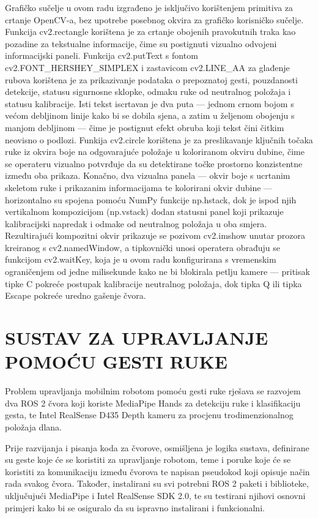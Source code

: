 \documentclass[12pt,a4paper,oneside]{report}
\begin{document}
Grafičko sučelje u ovom radu izgrađeno je isključivo korištenjem primitiva za crtanje OpenCV-a, bez 
upotrebe posebnog okvira za grafičko korisničko sučelje. Funkcija cv2.rectangle korištena je za crtanje 
obojenih pravokutnih traka kao pozadine za tekstualne informacije, čime su postignuti vizualno odvojeni 
informacijski paneli. Funkcija cv2.putText s fontom cv2.FONT\_HERSHEY\_SIMPLEX i zastavicom cv2.LINE\_AA za 
glađenje rubova korištena je za prikazivanje podataka o prepoznatoj gesti, pouzdanosti detekcije, statusu 
sigurnosne sklopke, odmaku ruke od neutralnog položaja i statusu kalibracije. Isti tekst iscrtavan je dva 
puta — jednom crnom bojom s većom debljinom linije kako bi se dobila sjena, a zatim u željenom obojenju s 
manjom debljinom — čime je postignut efekt obruba koji tekst čini čitkim neovisno o podlozi. Funkija 
cv2.circle korištena je za preslikavanje ključnih točaka ruke iz okvira boje na odgovarajuće položaje u 
koloriranom okviru dubine, čime se operateru vizualno potvrđuje da su detektirane točke prostorno 
konzistentne između oba prikaza. Konačno, dva vizualna panela — okvir boje s ucrtanim skeletom ruke i 
prikazanim informacijama te kolorirani okvir dubine — horizontalno su spojena pomoću NumPy funkcije 
np.hstack, dok je ispod njih vertikalnom kompozicijom (np.vstack) dodan statusni panel koji prikazuje 
kalibracijski napredak i odmake od neutralnog položaja u oba smjera. Rezultirajući kompozitni okvir 
prikazuje se pozivom cv2.imshow unutar prozora kreiranog s cv2.namedWindow, a tipkovnički unosi operatera 
obrađuju se funkcijom cv2.waitKey, koja je u ovom radu konfigurirana s vremenskim ograničenjem od jedne 
milisekunde kako ne bi blokirala petlju kamere — pritisak tipke C pokreće postupak kalibracije neutralnog 
položaja, dok tipka Q ili tipka Escape pokreće uredno gašenje čvora.

\chapter{SUSTAV ZA UPRAVLJANJE POMOĆU GESTI RUKE}
Problem upravljanja mobilnim robotom pomoću gesti ruke rješava se razvojem dva ROS 2 čvora koji koriste 
MediaPipe Hands za detekciju ruke i klasifikaciju gesta, te Intel RealSense D435 Depth kameru za procjenu 
trodimenzionalnog položaja dlana. 

Prije razvijanja i pisanja koda za čvorove, osmišljena je logika sustava, definirane su geste koje će se 
koristiti za upravljanje robotom, teme i poruke koje će se koristiti za komunikaciju između čvorova te 
napisan pseudokod koji opisuje način rada svakog čvora. Također, instalirani su svi potrebni ROS 2 paketi 
i biblioteke, uključujući MediaPipe i Intel RealSense SDK 2.0, te su testirani njihovi osnovni primjeri
kako bi se osiguralo da su ispravno instalirani i funkcionalni. 
\end{document}
